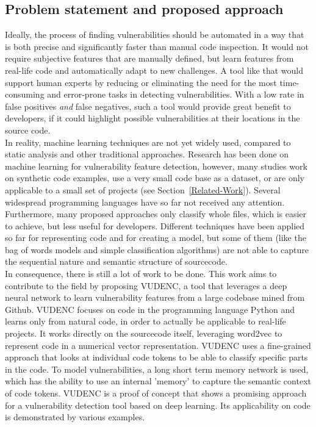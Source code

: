 \documentclass[
a4paper,
pagesize,
pdftex,
12pt,
twoside, %
BCOR=5mm, %
ngerman,
fleqn,
final,
]{scrartcl}
\begin{document}
	\subsection{Problem statement and proposed approach}
	Ideally, the process of finding vulnerabilities should be automated in a way that is both precise and significantly faster than manual code inspection. It would not require subjective features that are manually defined, but learn features from real-life code and automatically adapt to new challenges. A tool like that would support human experts by reducing or eliminating the need for the most time-consuming and error-prone tasks in detecting vulnerabilities. With a low rate in false positives \textit{and} false negatives, such a tool would provide great benefit to developers, if it could highlight possible vulnerabilities at their locations in the source code.\\	
	In reality, machine learning techniques are not yet widely used, compared to static analysis and other traditional approaches. Research has been done on machine learning for vulnerability feature detection, however, many studies work on synthetic code examples, use a very small code base as a dataset, or are only applicable to a small set of projects (see Section~\ref{Related-Work}). Several widespread programming languages have so far not received any attention. Furthermore, many proposed approaches only classify whole files, which is easier to achieve, but less useful for developers. Different techniques have been applied so far for representing code and for creating a model, but some of them (like the bag of words models and simple classification algorithms) are not able to capture the sequential nature and semantic structure of sourcecode.\\
	In consequence, there is still a lot of work to be done. This work aims to contribute to the field by proposing VUDENC, a tool that leverages a deep neural network to learn vulnerability features from a large codebase mined from Github. VUDENC focuses on code in the programming language Python and learns only from natural code, in order to actually be applicable to real-life projects. It works directly on the sourcecode itself, leveraging word2vec to represent code in a numerical vector representation. VUDENC uses a fine-grained approach that looks at individual code tokens to be able to classify specific parts in the code. To model vulnerabilities, a long short term memory network is used, which has the ability to use an internal 'memory' to capture the semantic context of code tokens. VUDENC is a proof of concept that shows a promising approach for a vulnerability detection tool based on deep learning. Its applicability on code is demonstrated by various examples. 
	
\end{document}
